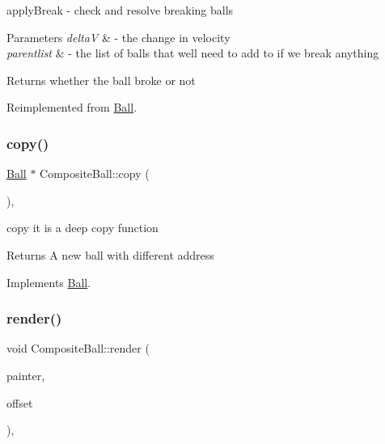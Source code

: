 apply\+Break -\/ check and resolve breaking balls 


\begin{DoxyParams}{Parameters}
{\em deltaV} & -\/ the change in velocity \\
\hline
{\em parentlist} & -\/ the list of balls that we\textquotesingle{}ll need to add to if we break anything \\
\hline
\end{DoxyParams}
\begin{DoxyReturn}{Returns}
whether the ball broke or not 
\end{DoxyReturn}


Reimplemented from \mbox{\hyperlink{class_ball}{Ball}}.

\mbox{\label{class_composite_ball_ad00585e160c3b030435d567141574fd2}} 
\subsubsection{\texorpdfstring{copy()}{copy()}}
{\footnotesize\ttfamily \mbox{\hyperlink{class_ball}{Ball}} $\ast$ Composite\+Ball\+::copy (\begin{DoxyParamCaption}{ }\end{DoxyParamCaption})\hspace{0.3cm}{\ttfamily [override]}, {\ttfamily [virtual]}}



copy it is a deep copy function 

\begin{DoxyReturn}{Returns}
A new ball with different address 
\end{DoxyReturn}


Implements \mbox{\hyperlink{class_ball_ae6c0731fabb7a45ba36df62a1975661a}{Ball}}.

\mbox{\label{class_composite_ball_a2aefe32771e1cde5dc8f51d779c880eb}} 
\subsubsection{\texorpdfstring{render()}{render()}}
{\footnotesize\ttfamily void Composite\+Ball\+::render (\begin{DoxyParamCaption}\item[{Q\+Painter \&}]{painter,  }\item[{const Q\+Vector2D \&}]{offset }\end{DoxyParamCaption})\hspace{0.3cm}{\ttfamily [override]}, {\ttfamily [virtual]}}



